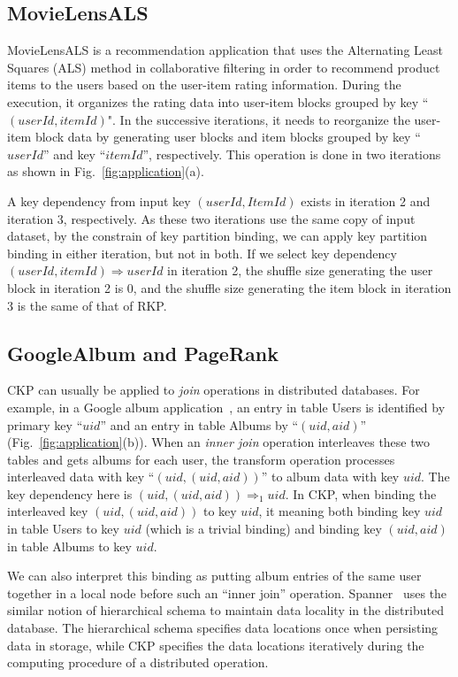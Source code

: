 \documentclass[10pt,journal,compsoc]{IEEEtran}
\begin{document}
\subsection{MovieLensALS}
MovieLensALS \cite{movielensals} is a
recommendation application that uses the Alternating Least Squares (ALS)
method in collaborative filtering in order to recommend product
items to the users based on the user-item rating information.
During the execution, it organizes the rating data into user-item
blocks grouped by key ``$(userId, itemId)$".
In the successive iterations, it needs to reorganize the user-item block
data by generating user blocks and item blocks grouped by
key ``$userId$'' and key ``$itemId$'', respectively.
This operation is done in two iterations as shown in Fig.~\ref{fig:application}(a). 

A key dependency from input key $(userId, ItemId)$ exists in
iteration 2 and iteration 3, respectively.
As these two iterations use the same copy of input dataset, 
by the constrain of key partition binding, 
we can apply key partition binding in either iteration, 
but not in both.
If we select key dependency $(userId, itemId) \Rightarrow
userId$ in iteration 2, the shuffle size generating the user block 
in iteration 2 is $0$, 
and the shuffle size generating the item block in iteration 3 
is the same of that of RKP.


\subsection{GoogleAlbum and PageRank}
CKP can usually be applied to \emph{join} operations in distributed databases.
For example, in a Google album application~\cite{google2012spanner}, 
an entry in table Users is identified by primary key ``$uid$''
and an entry in table Albums by ``$(uid, aid)$'' (Fig.~\ref{fig:application}(b)). 
When an \emph{inner join} operation interleaves these two tables and gets albums for 
each user, the transform operation processes interleaved data 
with key ``$(uid, (uid, aid))$'' to album data with key $uid$. 
The key dependency here is $(uid, (uid, aid)) \Rightarrow_{1} uid$.
In CKP, when binding the interleaved key $(uid, (uid, aid))$ to key $uid$, 
it meaning both binding key $uid$ in table Users to key $uid$ (which is a trivial binding)
and binding key $(uid, aid)$ in table Albums to key $uid$. 

We can also interpret this binding as putting album entries 
of the same user together
in a local node before such an ``inner join'' operation.
Spanner~\cite{google2012spanner} uses the similar notion of 
hierarchical schema to maintain data locality in the distributed database. 
The hierarchical schema specifies data locations once when persisting data in storage, 
while CKP specifies the data locations iteratively during the computing procedure of a distributed operation.
\end{document}
